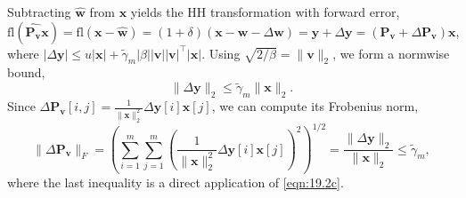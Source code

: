 \documentclass[review,onefignum,onetabnum]{siamart190516}
\newcommand{\R}{\mathbb{R}}
\newcommand{\dd}{\delta}
\newcommand{\bb}[1]{\mathbf{#1}}
\newcommand{\fl}{\mathrm{fl}}
\begin{document}
Subtracting $\hat{\bb{w}}$ from $\bb{x}$ yields the HH transformation with forward error, 
\begin{equation}
\fl(\hat{\bb{P_v}}\bb{x}) = \fl(\bb{x}-\bb{\hat{w}}) = (1+\dd)(\bb{x}-\bb{w}-\Delta \bb{w}) = \bb{y} + \Delta \bb{y} = (\bb{P_v} + \Delta \bb{P_v})\bb{x},\label{eqn:applyP}
\end{equation}
where $|\Delta \bb{y}| \leq u|\bb{x}| + \tilde{\gamma}_{m} |\beta||\bb{v}||\bb{v}|^{\top}|\bb{x}|$.
Using $\sqrt{2/\beta} = \|\bb{v}\|_2$, we form a normwise bound,
\begin{equation}
\|\Delta \bb{y}\|_2 \leq \tilde{\gamma}_{m}\|\bb{x}\|_2. \label{eqn:19.2c}
\end{equation} 
Since $\Delta \bb{P_v}[i,j] = \frac{1}{\|\bb{x}\|_2^2}\Delta \bb{y}[i]\bb{x}[j]$, we can compute its Frobenius norm,
\begin{equation}
\|\Delta \bb{P_v}\|_F
= \left(\sum_{i=1}^m\sum_{j=1}^m\left(\frac{1}{\|\bb{x}\|_2^2}\Delta \bb{y}[i]\bb{x}[j]\right)^2\right)^{1/2}
=  \frac{\|\Delta \bb{y}\|_2}{\|\bb{x}\|_2} \leq \tilde{\gamma}_{m}\label{eqn:outer},
\end{equation}
where the last inequality is a direct application of \cref{eqn:19.2c}.
\end{document}
